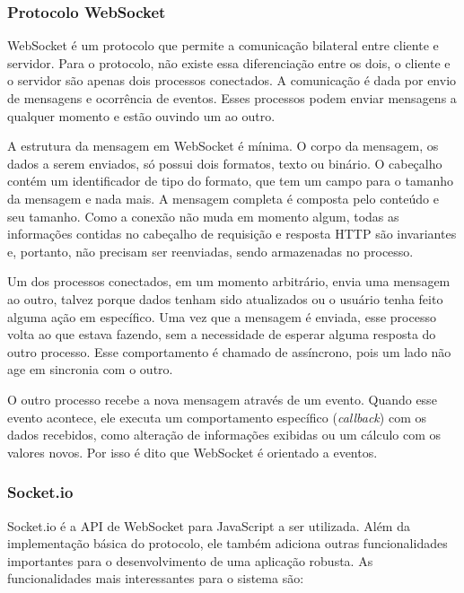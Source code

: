 \documentclass[a4paper,12pt]{article}
\begin{document}
\subsubsection{Protocolo WebSocket}

WebSocket é um protocolo que permite a comunicação bilateral entre cliente e servidor. Para o protocolo, não existe essa diferenciação entre os dois, o cliente e o servidor são apenas dois processos conectados. A comunicação é dada por envio de mensagens e ocorrência de eventos. Esses processos podem enviar mensagens a qualquer momento e estão ouvindo um ao outro.

A estrutura da mensagem em WebSocket é mínima. O corpo da mensagem, os dados a serem enviados, só possui dois formatos, texto ou binário. O cabeçalho contém um identificador de tipo do formato, que tem um campo para o tamanho da mensagem e nada mais. A mensagem completa é composta pelo conteúdo e seu tamanho. Como a conexão não muda em momento algum, todas as informações contidas no cabeçalho de requisição e resposta HTTP são invariantes e, portanto, não precisam ser reenviadas, sendo armazenadas no processo.

Um dos processos conectados, em um momento arbitrário, envia uma mensagem ao outro, talvez porque dados tenham sido atualizados ou o usuário tenha feito alguma ação em específico. Uma vez que a mensagem é enviada, esse processo volta ao que estava fazendo, sem a necessidade de esperar alguma resposta do outro processo. Esse comportamento é chamado de assíncrono, pois um lado não age em sincronia com o outro.

O outro processo recebe a nova mensagem através de um evento. Quando esse evento acontece, ele executa um comportamento específico (\emph{callback}) com os dados recebidos, como alteração de informações exibidas ou um cálculo com os valores novos. Por isso é dito que WebSocket é orientado a eventos.


\subsubsection{Socket.io}

Socket.io é a API de WebSocket para JavaScript a ser utilizada. Além da implementação básica do protocolo, ele também adiciona outras funcionalidades importantes para o desenvolvimento de uma aplicação robusta. As funcionalidades mais interessantes para o sistema são:
\end{document}
